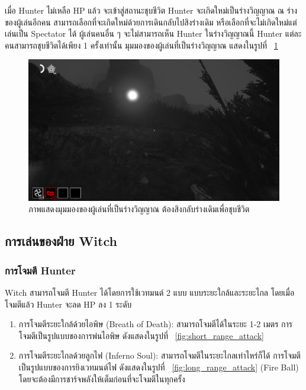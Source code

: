 เมื่อ Hunter ไม่เหลือ HP แล้ว จะเข้าสู่สถานะชุบชีวิต Hunter จะเกิดใหม่เป็นร่างวิญญาณ ณ ร่างของผู้เล่นอีกคน 
สามารถเลือกที่จะเกิดใหม่ด้วยการเดินกลับไปสิงร่างเดิม หรือเลือกที่จะไม่เกิดใหม่แต่เล่นเป็น Spectator ได้ ผู้เล่นคนอื่น ๆ 
จะไม่สามารถเห็น Hunter ในร่างวิญญาณนี้ Hunter แต่ละคนสามารถชุบชีวิตได้เพียง 1 ครั้งเท่านั้น มุมมองของผู้เล่นที่เป็นร่างวิญญาณ แสดงในรูปที่ ~\ref{fig:revive}

\begin{figure}[p]
  \begin{center}
  \includegraphics[width=\textwidth]{./img/mechanics/revive.png}
  \end{center}
  \caption[ภาพแสดงมุมมองของผู้เล่นที่เป็นร่างวิญญาณ ต้องสิงกลับร่างเดิมเพื่อชุบชีวิต]{ภาพแสดงมุมมองของผู้เล่นที่เป็นร่างวิญญาณ ต้องสิงกลับร่างเดิมเพื่อชุบชีวิต}
  \label{fig:revive}
\end{figure}

\subsection{การเล่นของฝ่าย Witch}

\subsubsection{การโจมตี Hunter}

Witch สามารถโจมตี Hunter ได้โดยการใช้เวทมนต์ 2 แบบ แบบระยะใกล้และระยะไกล โดยเมื่อโจมตีแล้ว 
Hunter จะลด HP ลง 1 ระดับ

\begin{enumerate}
  \item การโจมตีระยะใกล้ด้วยไอพิษ (Breath of Death): สามารถโจมตีได้ในระยะ 1-2 เมตร การโจมตีเป็นรูปแบบของการพ่นไอพิษ ดังแสดงในรูปที่ ~\ref{fig:short_range_attack}
  \item การโจมตีระยะไกลด้วยลูกไฟ (Inferno Soul): สามารถโจมตีในระยะไกลเท่าไหร่ก็ได้ การโจมตีเป็นรูปแบบของการยิงเวทมนต์ไฟ ดังแสดงในรูปที่ ~\ref{fig:long_range_attack}
(Fire Ball) โดยจะต้องมีการชาร์จพลังให้เต็มก่อนที่จะโจมตีในทุกครั้ง
\end{enumerate}

